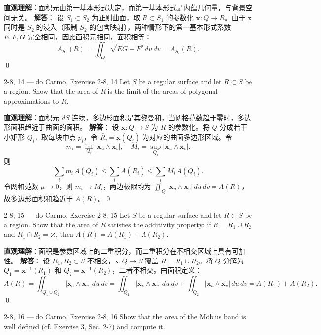 \begin{solution}
\textbf{直观理解}：面积元由第一基本形式决定，而第一基本形式是内蕴几何量，与背景空间无关。
\textbf{解答}：
设 $S_1 \subset S_2$ 为正则曲面，取 $R \subset S_1$ 的参数化 $\mathbf{x}: Q \to R$。由于 $\mathbf{x}$ 同时是 $S_2$ 的浸入（限制 $S_2$ 的包含映射），两种情形下的第一基本形式系数 $E, F, G$ 完全相同，因此面积元相同，面积相等：
\[
A_{S_1}(R) = \iint_Q \sqrt{EG-F^2} \, du \, dv = A_{S_2}(R).
\]
\qed
\end{solution}
\begin{exercise}
{2-8, 14 — do Carmo, Exercise 2-8, 14}
Let $S$ be a regular surface and let $R \subset S$ be a region. Show that the area of $R$ is the limit of the areas of polygonal approximations to $R$.


\end{exercise}

\begin{solution}
\textbf{直观理解}：面积元 $dS$ 连续，多边形面积是其黎曼和，当网格范数趋于零时，多边形面积趋近于曲面的面积。
\textbf{解答}：
设 $\mathbf{x}: Q \to S$ 为 $R$ 的参数化。将 $Q$ 分成若干小矩形 $Q_i$，取每块中点 $p_i$，令 $\bar{R}_i = \mathbf{x}(Q_i)$ 为对应的曲面多边形区域。令
\[
m_i = \inf_{Q_i} |\mathbf{x}_u \wedge \mathbf{x}_v|, \quad M_i = \sup_{Q_i} |\mathbf{x}_u \wedge \mathbf{x}_v|.
\]
则
\[
\sum_i m_i \, A(Q_i) \leq \sum_i A(\bar{R}_i) \leq \sum_i M_i \, A(Q_i).
\]
令网格范数 $\mu \to 0$，则 $m_i \to M_i$，两边极限均为 $\iint_Q |\mathbf{x}_u \wedge \mathbf{x}_v| \, du \, dv = A(R)$，故多边形面积和趋近于 $A(R)$。\qed
\end{solution}
\begin{exercise}
{2-8, 15 — do Carmo, Exercise 2-8, 15}
Let $S$ be a regular surface and let $R \subset S$ be a region. Show that the area of $R$ satisfies the additivity property: if $R = R_1 \cup R_2$ and $R_1 \cap R_2 = \varnothing$, then $A(R) = A(R_1) + A(R_2)$.


\end{exercise}

\begin{solution}
\textbf{直观理解}：面积是参数区域上的二重积分，而二重积分在不相交区域上具有可加性。
\textbf{解答}：
设 $R_1, R_2 \subset S$ 不相交，$\mathbf{x}: Q \to S$ 覆盖 $R = R_1 \cup R_2$。将 $Q$ 分解为 $Q_1 = \mathbf{x}^{-1}(R_1)$ 和 $Q_2 = \mathbf{x}^{-1}(R_2)$，二者不相交。由面积定义：
\[
A(R) = \iint_{Q_1 \cup Q_2} |\mathbf{x}_u \wedge \mathbf{x}_v| \, du \, dv = \iint_{Q_1} |\mathbf{x}_u \wedge \mathbf{x}_v| \, du \, dv + \iint_{Q_2} |\mathbf{x}_u \wedge \mathbf{x}_v| \, du \, dv = A(R_1) + A(R_2).
\]
\qed
\end{solution}
\begin{exercise}
{2-8, 16 — do Carmo, Exercise 2-8, 16}
Show that the area of the M\"obius band is well defined (cf. Exercise 3, Sec. 2-7) and compute it.


\end{exercise}

